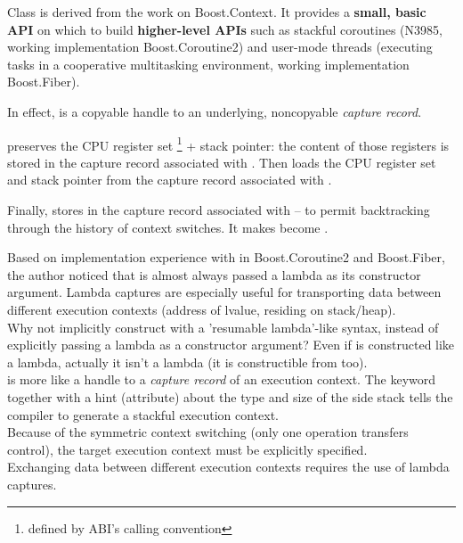 Class \ectx is derived from the work on Boost.Context\cite{bcontext}. It
provides a {\bfseries small, basic API} on which to build {\bfseries
higher-level APIs} such as stackful coroutines (N3985\cite{N3985}, working
implementation Boost.Coroutine2\cite{bcoroutine2}) and user-mode threads
(executing tasks in a cooperative multitasking environment, working
implementation Boost.Fiber\cite{bfiber}).

In effect,  is a copyable handle to an underlying,
noncopyable \emph{capture record}.

 preserves the CPU register set
\footnote{defined by ABI's calling convention} + stack pointer: the content of
those registers is stored in the capture record associated with
. Then  loads the CPU register
set and stack pointer from the capture record associated with .

Finally, 
stores  in the capture record
associated with  -- to permit backtracking through the history of
context switches. It makes  become .

Based on implementation experience with  in
Boost.Coroutine2\cite{bcoroutine2} and Boost.Fiber\cite{bfiber}, the author
noticed that  is almost always passed a lambda as its
constructor argument. Lambda captures are especially useful for transporting
data between different execution contexts (address of lvalue, residing on
stack/heap).\\
Why not implicitly construct \ectx with a 'resumable lambda'-like
syntax\cite{N4244}, instead of explicitly passing a lambda as a constructor
argument? Even if \ectx is constructed like a lambda, actually it isn't a
lambda (it is constructible from \ectxcurrent too).\\
\ectx is more like a handle to a \emph{capture record} of an execution
context.
The keyword \resumable together with a hint (attribute) about the type and size
of the side stack tells the compiler to generate a stackful execution context.\\
Because of the symmetric context switching (only one operation transfers
control), the target execution context must be explicitly specified.\\
Exchanging data between different execution contexts requires the use of lambda
captures.

